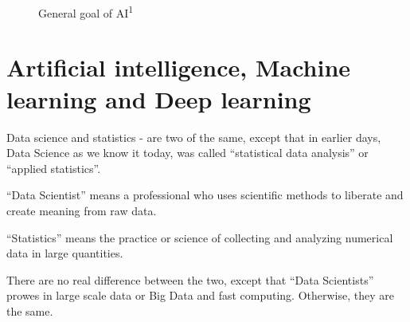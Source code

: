 \documentclass[
  paper=6in:9in,
  pagesize=pdftex,
  headinclude=on,
  footinclude=on,
  12pt]{scrbook}
\begin{document}
\begin{tcolorbox}[enhanced jigsaw, colbacktitle=quarto-callout-caution-color!10!white, arc=.35mm, opacitybacktitle=0.6, titlerule=0mm, opacityback=0, bottomtitle=1mm, title=\textcolor{quarto-callout-caution-color}{\faFire}\hspace{0.5em}{So, why do we need AI?}, breakable, toptitle=1mm, colback=white, rightrule=.15mm, colframe=quarto-callout-caution-color-frame, left=2mm, bottomrule=.15mm, toprule=.15mm, leftrule=.75mm, coltitle=black]

\begin{figure}[H]


\caption{\label{fig-ml-google}General goal of AI\textsuperscript{1}}

\end{figure}%

\end{tcolorbox}

\section{Artificial intelligence, Machine learning and Deep
learning}\label{artificial-intelligence-machine-learning-and-deep-learning}

Data science and statistics - are two of the same, except that in
earlier days, Data Science as we know it today, was called ``statistical
data analysis'' or ``applied statistics''.

``Data Scientist'' means a professional who uses scientific methods to
liberate and create meaning from raw data.

``Statistics'' means the practice or science of collecting and analyzing
numerical data in large quantities.

There are no real difference between the two, except that ``Data
Scientists'' prowes in large scale data or Big Data and fast computing.
Otherwise, they are the same.
\end{document}
